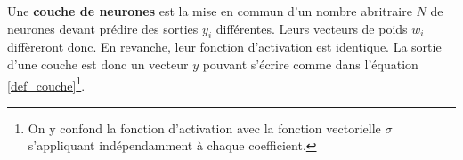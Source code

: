 \documentclass[12pt, french, twoside]{report}
\begin{document}
Une \textbf{couche de neurones} est la mise en commun d'un nombre abritraire $N$ de neurones devant prédire des sorties $y_i$ différentes. Leurs vecteurs de poids $w_i$ diffèreront donc. En revanche, leur fonction d'activation est identique. La sortie d'une couche est donc un vecteur $y$ pouvant s'écrire comme dans l'équation \ref{def_couche}\footnote{On y confond la fonction d'activation avec la fonction vectorielle $\sigma$ s'appliquant indépendamment à chaque coefficient.}.
\end{document}
